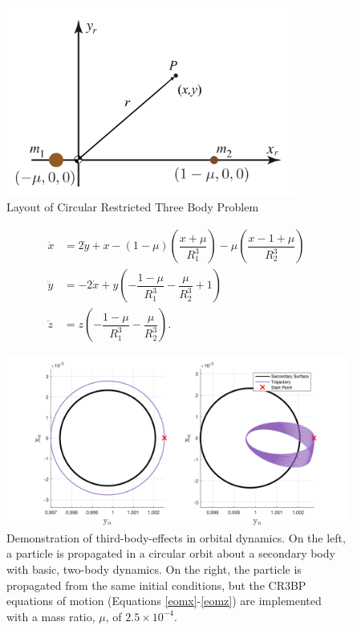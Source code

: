 \documentclass[11pt]{article} %
\begin{document}
\begin{figure}[H]
\centering
\includegraphics[width=3.75in]{CR3BP.png}
\caption{Layout of Circular Restricted Three Body Problem \cite{KoonLoMarsdenRoss2011}}
\label{fig:CR3BP}
\end{figure}

\begin{align}
\ddot{x} &=  2\dot{y} + x - (1-\mu)\left(\dfrac{x+\mu}{R_1^3}\right) - \mu\left(\dfrac{x-1+\mu}{R_2^3}\right) \label{eomx}\\
\ddot{y} &= - 2\dot{x} + y\left(-\dfrac{1-\mu}{R_1^3} - \dfrac{\mu}{R_2^3} + 1\right) \label{eomy}\\
\ddot{z} &= z\left(-\dfrac{1 - \mu}{R_1^3} - \dfrac{\mu}{R_2^3}\right). \label{eomz}
\end{align} 

\begin{figure}[H]
\centering
\includegraphics[width=6in]{cr3bpEffectExample.png}
\caption{Demonstration of third-body-effects in orbital dynamics. On the left, a particle is propagated in a circular orbit about a secondary body with basic, two-body dynamics. On the right, the particle is propagated from the same initial conditions, but the CR3BP equations of motion (Equations \ref{eomx}-\ref{eomz}) are implemented with a mass ratio, $\mu$, of $2.5\times10^{-4}$.}
\label{fig:cr3bpEffectExample}
\end{figure}
\end{document}
